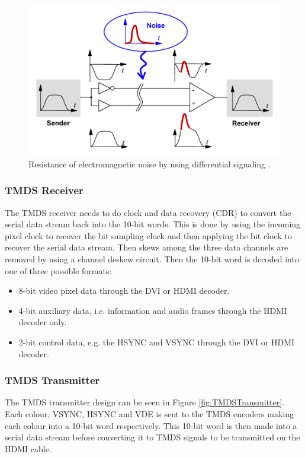 \begin{figure}[h]
    \centering
    \includegraphics{img/DiffSignaling.png}
    \caption[Resistance of electromagnetic noise by using differential signaling]{
        Resistance of electromagnetic noise by using differential signaling \cite{wikids}.
    }
    \label{fig:differential_signal}
\end{figure}

\subsubsection{TMDS Receiver}
The TMDS receiver needs to do clock and data recovery (CDR) to convert the serial data stream back into the 10-bit words.
This is done by using the incoming pixel clock to recover the bit sampling clock and then applying the bit clock to recover the serial data stream.
Then skews among the three data channels are removed by using a channel deskew circuit.
Then the 10-bit word is decoded into one of three possible formats:
\begin{itemize}
    \item   8-bit video pixel data through the DVI or HDMI decoder.
    \item   4-bit auxiliary data, i.e. information and audio frames through the HDMI decoder only.
    \item   2-bit control data, e.g. the HSYNC and VSYNC through the DVI or HDMI decoder.
\end{itemize}

\subsubsection{TMDS Transmitter}
The TMDS transmitter design can be seen in Figure \ref{fig:TMDSTransmitter}.
Each colour, VSYNC, HSYNC and VDE is sent to the TMDS encoders making each colour into a 10-bit word respectively. This 10-bit word is then made into a serial data stream before converting it to TMDS signals to be transmitted on the HDMI cable.

